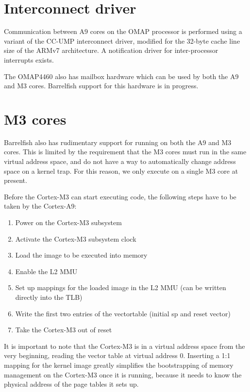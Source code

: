 \documentclass[a4paper,twoside]{report} %
\begin{document}
\section{Interconnect driver}\label{sec:interconnect}

Communication between A9 cores on the OMAP processor is performed
using a variant of the CC-UMP interconnect driver, modified for the
32-byte cache line size of the ARMv7 architecture.  A notification
driver for inter-processor interrupts exists. 

The OMAP4460 also has mailbox hardware which can be used by both the
A9 and M3 cores.  Barrelfish support for this hardware is in
progress. 

\section{M3 cores}

Barrelfish also has rudimentary support for running on both the A9 and
M3 cores.  This is limited by the requirement that the M3 cores must
run in the same virtual address space, and do not have a way to
automatically change address space on a kernel trap.  For this reason,
we only execute on a single M3 core at present. 

Before the Cortex-M3 can start executing code, the following steps
have to be taken by the Cortex-A9:

\begin{enumerate}
\item Power on the Cortex-M3 subsystem
\item Activate the Cortex-M3 subsystem clock
\item Load the image to be executed into memory
\item Enable the L2 MMU
\item Set up mappings for the loaded image in the L2 MMU (can be
  written directly into the TLB)
\item Write the first two entries of the vectortable (initial sp and
  reset vector)
\item Take the Cortex-M3 out of reset
\end{enumerate}

It is important to note that the Cortex-M3 is in a virtual address
space from the very beginning, reading the vector table at virtual
address 0. Inserting a 1:1 mapping for the kernel image greatly
simplifies the bootstrapping of memory management on the Cortex-M3
once it is running, because it needs to know the physical address of
the page tables it sets up.




\end{document}
